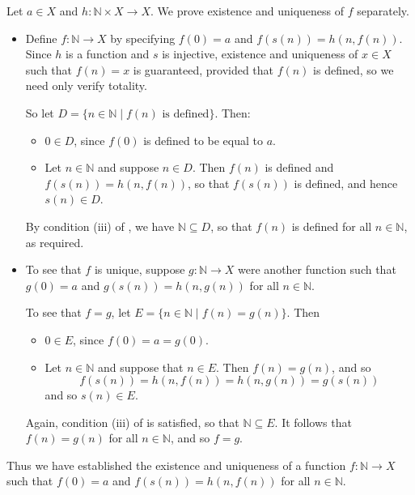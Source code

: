 \begin{cproof}
Let $a \in X$ and $h : \mathbb{N} \times X \to X$. We prove existence and uniqueness of $f$ separately.

\begin{itemize}
\item Define $f : \mathbb{N} \to X$ by specifying $f(0) = a$ and $f(s(n)) = h(n, f(n))$. Since $h$ is a function and $s$ is injective, existence and uniqueness of $x \in X$ such that $f(n) = x$ is guaranteed, provided that $f(n)$ is defined, so we need only verify totality.

So let $D = \{ n \in \mathbb{N} \mid f(n) \text{ is defined} \}$. Then:

\begin{itemize}
\item $0 \in D$, since $f(0)$ is defined to be equal to $a$.
\item Let $n \in \mathbb{N}$ and suppose $n \in D$. Then $f(n)$ is defined and $f(s(n)) = h(n, f(n))$, so that $f(s(n))$ is defined, and hence $s(n) \in D$.
\end{itemize}

By condition (iii) of , we have $\mathbb{N} \subseteq D$, so that $f(n)$ is defined for all $n \in \mathbb{N}$, as required.

\item To see that $f$ is unique, suppose $g : \mathbb{N} \to X$ were another function such that $g(0) = a$ and $g(s(n)) = h(n, g(n))$ for all $n \in \mathbb{N}$.

To see that $f = g$, let $E = \{ n \in \mathbb{N} \mid f(n) = g(n) \}$. Then
\begin{itemize}
\item $0 \in E$, since $f(0) = a = g(0)$.
\item Let $n \in \mathbb{N}$ and suppose that $n \in E$. Then $f(n) = g(n)$, and so
\[ f(s(n)) = h(n,f(n)) = h(n,g(n)) = g(s(n)) \]
and so $s(n) \in E$.
\end{itemize}
Again, condition (iii) of  is satisfied, so that $\mathbb{N} \subseteq E$. It follows that $f(n) = g(n)$ for all $n \in \mathbb{N}$, and so $f=g$.
\end{itemize}

Thus we have established the existence and uniqueness of a function $f : \mathbb{N} \to X$ such that $f(0) = a$ and $f(s(n)) = h(n, f(n))$ for all $n \in \mathbb{N}$.
\end{cproof}

